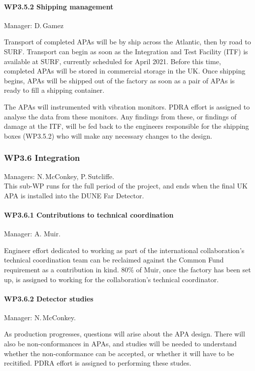 \paragraph{WP3.5.2 Shipping management} Manager: D.\,Gamez

Transport of completed APAs will be by ship across the Atlantic, then by road to SURF. Transport can begin as soon as the Integration and Test Facility (ITF) is available at SURF, currently scheduled for April 2021. Before this time, completed APAs will be stored in commercial storage in the UK. Once shipping begins, APAs will be shipped out of the factory as soon as a pair of APAs is ready to fill a shipping container.

The APAs will instrumented with vibration monitors. PDRA effort is assigned to analyse the data from these monitors. Any findings from these, or findings of damage at the ITF, will be fed back to the engineers responsible for the shipping boxes (WP3.5.2) who will make any necessary changes to the design.

\subsubsection{WP3.6 Integration}
Managers: N.\,McConkey, P.\,Sutcliffe.\\
This sub-WP runs for the full period of the project, and ends when the final UK APA is installed into the DUNE Far Detector.

\paragraph{WP3.6.1 Contributions to technical coordination} Manager: A. Muir.

Engineer effort dedicated to working as part of the international collaboration's technical coordination team can be reclaimed against the Common Fund requirement as a contribution in kind. 80\% of Muir, once the factory has been set up, is assigned to working for the collaboration's technical coordinator.

\paragraph{WP3.6.2 Detector studies} Manager: N.\,McConkey.

As production progresses, questions will arise about the APA design. There will also be non-conformances in APAs, and studies will be needed to understand whether the non-conformance can be accepted, or whether it will have to be recitified. PDRA effort is assigned to performing these studes.

